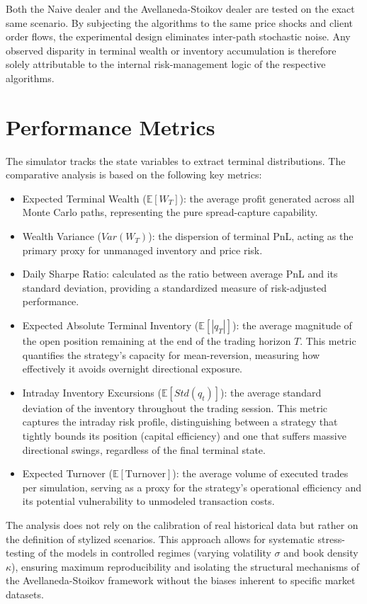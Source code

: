 \documentclass[a4paper,10pt,titlepage,oneside,openany]{book}
\theoremstyle{plain}\newtheorem{theorem}{Theorem}[chapter]
\theoremstyle{definition}\newtheorem{definition}{Definition}[chapter]
\theoremstyle{remark}\newtheorem{remark}{Remark}[chapter]
\begin{document}
Both the Naive dealer and the Avellaneda-Stoikov dealer are tested on the exact same scenario. By subjecting the algorithms to the same price shocks and client order flows, the experimental design eliminates inter-path stochastic noise. Any observed disparity in terminal wealth or inventory accumulation is therefore solely attributable to the internal risk-management logic of the respective algorithms.

\section{Performance Metrics}
The simulator tracks the state variables to extract terminal distributions. The comparative analysis is based on the following key metrics:

\begin{itemize}
    \item Expected Terminal Wealth ($\mathbb{E}[W_T]$): the average profit generated across all Monte Carlo paths, representing the pure spread-capture capability.
    \item Wealth Variance ($Var(W_T)$): the dispersion of terminal PnL, acting as the primary proxy for unmanaged inventory and price risk.
    \item Daily Sharpe Ratio: calculated as the ratio between average PnL and its standard deviation, providing a standardized measure of risk-adjusted performance.
    \item Expected Absolute Terminal Inventory ($\mathbb{E}[|q_T|]$): the average magnitude of the open position remaining at the end of the trading horizon $T$. This metric quantifies the strategy's capacity for mean-reversion, measuring how effectively it avoids overnight directional exposure.
    \item Intraday Inventory Excursions ($\mathbb{E}[Std(q_t)]$): the average standard deviation of the inventory throughout the trading session. This metric captures the intraday risk profile, distinguishing between a strategy that tightly bounds its position (capital efficiency) and one that suffers massive directional swings, regardless of the final terminal state.
    \item Expected Turnover ($\mathbb{E}[\text{Turnover}]$): the average volume of executed trades per simulation, serving as a proxy for the strategy's operational efficiency and its potential vulnerability to unmodeled transaction costs.
\end{itemize}

The analysis does not rely on the calibration of real historical data but rather on the definition of stylized scenarios. This approach allows for systematic stress-testing of the models in controlled regimes (varying volatility $\sigma$ and book density $\kappa$), ensuring maximum reproducibility and isolating the structural mechanisms of the Avellaneda-Stoikov framework without the biases inherent to specific market datasets.
\end{document}
